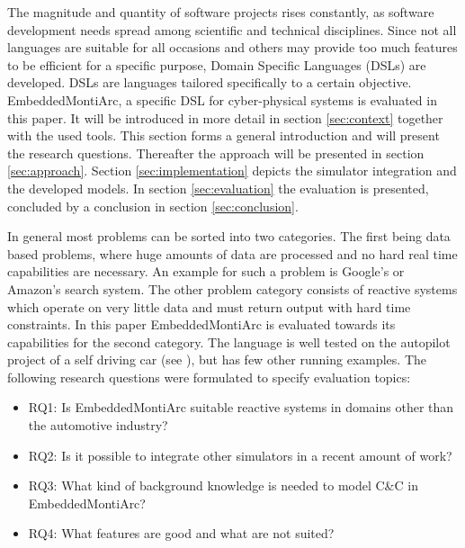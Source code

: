 The magnitude and quantity of software projects rises constantly, as software development needs spread among scientific and technical disciplines. Since not all languages are suitable for all occasions and others may provide too much features to be efficient for a specific purpose, Domain Specific Languages (DSLs) are developed. DSLs are languages tailored specifically to a certain objective.
EmbeddedMontiArc, a specific DSL for cyber-physical systems is evaluated in this paper. It will be introduced in more detail in section \ref{sec:context} together with the used tools. This section forms a general introduction and will present the research questions.
Thereafter the approach will be presented in section \ref{sec:approach}. Section \ref{sec:implementation} depicts the simulator integration and the developed models. In section \ref{sec:evaluation} the evaluation is presented, concluded by a conclusion in section \ref{sec:conclusion}.

In general most problems can be sorted into two categories. The first being data based problems, where huge amounts of data are processed and no hard real time capabilities are necessary. An example for such a problem is Google's or Amazon's search system. The other problem category consists of reactive systems which operate on very little data and must return output with hard time constraints. In this paper EmbeddedMontiArc is evaluated towards its capabilities for the second category. The language is well tested on the autopilot project of a self driving car (see \cite{emademo}), but has few other running examples.
The following research questions were formulated to specify evaluation topics:

\begin{itemize}
	\item RQ1: Is EmbeddedMontiArc suitable reactive systems in domains other than the automotive industry?
	\item RQ2: Is it possible to integrate other simulators in a recent amount of work?
	\item RQ3: What kind of background knowledge is needed to model C\&C in EmbeddedMontiArc?
	\item RQ4: What features are good and what are not suited?
\end{itemize}

